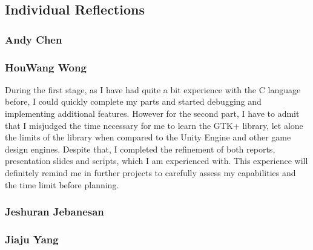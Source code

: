 \documentclass[10pt]{article}
\begin{document}
\subsection{Individual Reflections}
\subsubsection{Andy Chen}
\subsubsection{HouWang Wong}
During the first stage, as I have had quite a bit experience with the C language before, I could quickly complete my parts and started debugging and implementing additional features. However for the second part, I have to admit that I misjudged the time necessary for me to learn the GTK+ library, let alone the limits of the library when compared to the Unity Engine and other game design engines. Despite that, I completed the refinement of both reports, presentation slides and scripts, which I am experienced with. This experience will definitely remind me in further projects to carefully assess my capabilities and the time limit before planning.
\subsubsection{Jeshuran Jebanesan}
\subsubsection{Jiaju Yang}
\end{document}

